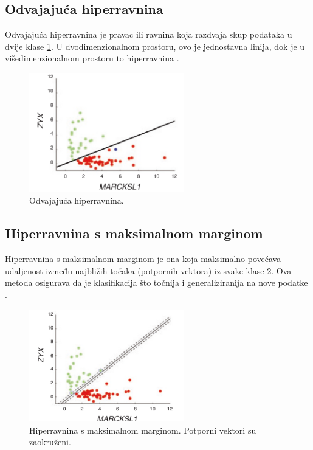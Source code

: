 \documentclass[zavrsnirad]{fer}
\begin{document}
\subsection{Odvajajuća hiperravnina}
Odvajajuća hiperravnina je pravac ili ravnina koja razdvaja skup podataka u dvije klase \ref{fig:odv_hiper}. U dvodimenzionalnom prostoru, ovo je jednostavna linija, dok je u višedimenzionalnom prostoru to hiperravnina \cite{Noble2006}.
\begin{figure}[h]
	\centering
	\includegraphics[width=0.6\textwidth]{Figures/odv_hiperravnina.png}
	\caption{Odvajajuća hiperravnina. \cite{Noble2006}}
	\label{fig:odv_hiper}
\end{figure}

\subsection{Hiperravnina s maksimalnom marginom}
Hiperravnina s maksimalnom marginom je ona koja maksimalno povećava udaljenost između najbližih točaka (potpornih vektora) iz svake klase \ref{fig:maks_marg}. Ova metoda osigurava da je klasifikacija što točnija i generaliziranija na nove podatke \cite{Noble2006}.
\begin{figure}[h]
	\centering
	\includegraphics[width=0.6\textwidth]{Figures/maks_margina.png}
	\caption{Hiperravnina s maksimalnom marginom. Potporni vektori su zaokruženi. \cite{Noble2006}}
	\label{fig:maks_marg}
\end{figure}
\end{document}
